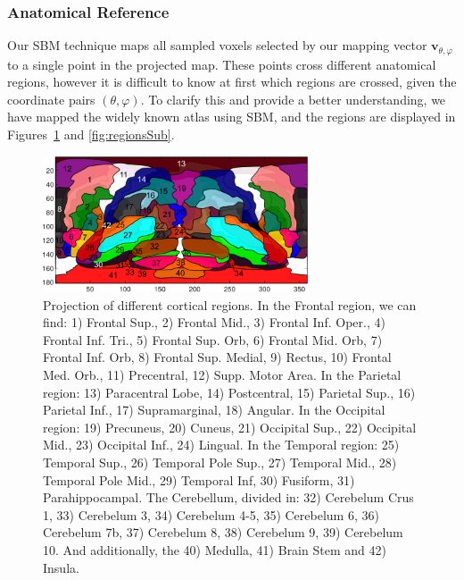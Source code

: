 \subsubsection{Anatomical Reference}\label{sec:anatomical}
Our \ac{SBM} technique maps all sampled voxels selected by our mapping vector $\mathbf{v}_{\theta,\varphi}$ to a single point in the projected map. These points cross different anatomical regions, however it is difficult to know at first which regions are crossed, given the coordinate pairs $(\theta,\varphi)$. To clarify this and provide a better understanding, we have mapped the widely known \cite{AAL} atlas \cite{Tzourio-Mazoyer2002} using \ac{SBM}, and the regions are displayed in Figures~\ref{fig:regionsCort} and \ref{fig:regionsSub}. 

\begin{figure}[htp]
	\centering
	\includegraphics[width=0.7\textwidth]{gfx/ch6/05-regions_cortical}
	
	\caption{Projection of different cortical regions. In the Frontal region, we can find: 1) Frontal Sup., 2) Frontal Mid., 3) Frontal Inf. Oper., 4) Frontal Inf. Tri., 5) Frontal Sup. Orb, 6) Frontal Mid. Orb, 7) Frontal Inf. Orb, 8) Frontal Sup. Medial, 9) Rectus, 10) Frontal Med. Orb., 11) Precentral, 12) Supp. Motor Area. In the Parietal region: 13) Paracentral Lobe, 14) Postcentral, 15) Parietal Sup., 16) Parietal Inf., 17) Supramarginal, 18) Angular. In the Occipital region: 19) Precuneus, 20) Cuneus, 21) Occipital Sup., 22) Occipital Mid., 23) Occipital Inf., 24) Lingual. In the Temporal region: 25) Temporal Sup., 26) Temporal Pole Sup., 27) Temporal Mid., 28) Temporal Pole Mid., 29) Temporal Inf, 30) Fusiform, 31) Parahippocampal. The Cerebellum, divided in: 32) Cerebelum Crus 1, 33) Cerebelum 3, 34) Cerebelum 4-5, 35) Cerebelum 6, 36) Cerebelum 7b, 37) Cerebelum 8, 38) Cerebelum 9, 39) Cerebelum 10. And additionally, the 40) Medulla, 41) Brain Stem and 42) Insula.}
	\label{fig:regionsCort}
\end{figure}


